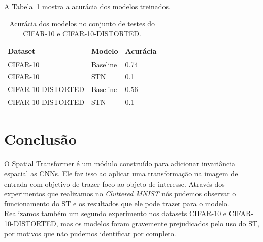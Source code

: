 \documentclass[conference]{IEEEtran}
\begin{document}
A Tabela~\ref{tab:c10-teste-accs} mostra a acurácia dos modelos treinados.

\begin{table}[!ht]
  \begin{center}
    \begin{tabular}{|l|l|l|}
      \hline
      \textbf{Dataset} & \textbf{Modelo} & \textbf{Acurácia} \\ \hline
      CIFAR-10           & Baseline & 0.74 \\ \hline
      CIFAR-10           & STN      & 0.1  \\ \hline
      CIFAR-10-DISTORTED & Baseline & 0.56 \\ \hline
      CIFAR-10-DISTORTED & STN      & 0.1  \\ \hline
    \end{tabular}
  \end{center}
  \caption{Acurácia dos modelos no conjunto de testes do CIFAR-10 e CIFAR-10-DISTORTED.}
  \label{tab:c10-teste-accs}
\end{table}

\section{Conclusão}

O Spatial Transformer é um módulo construído para adicionar invariância espacial as CNNs. Ele faz isso ao aplicar uma transformação na imagem de entrada com objetivo de trazer foco ao objeto de interesse. Através dos experimentos que realizamos no \textit{Cluttered MNIST} nós pudemos observar o funcionamento do ST e os resultados que ele pode trazer para o modelo. Realizamos também um segundo experimento nos datasets CIFAR-10 e CIFAR-10-DISTORTED, mas os modelos foram gravemente prejudicados pelo uso do ST, por motivos que não pudemos identificar por completo.





%
%
%






\end{document}

